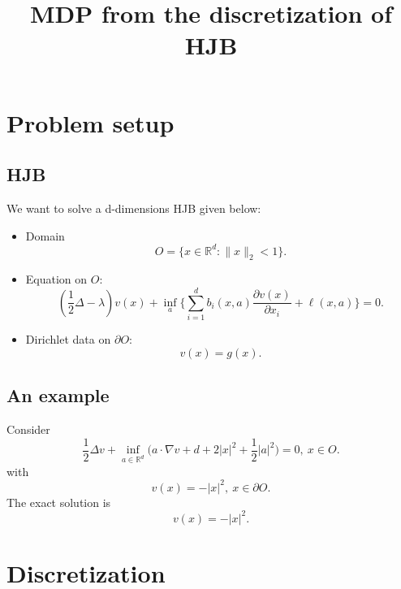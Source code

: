 \documentclass[11pt]{amsart}
\title{MDP from the discretization of HJB}
\begin{document}
\maketitle

\section{Problem setup}
\subsection{HJB}
We want to solve a d-dimensions HJB given below:
\begin{itemize}
 \item Domain 
 $$O = \{x\in \mathbb R^{d}: \|x\|_{2} < 1\}.$$
 \item Equation on $O$: 
 $$(\frac 1 2 \Delta -  \lambda) v(x) + \inf_a \Big\{
 \sum_{i=1}^db_i(x,a)  \frac{\partial v(x)}{\partial x_i}  
  + \ell(x,a)
 \Big\} = 0.$$
 \item Dirichlet data on $\partial O$:
 $$v(x) = g(x).$$
\end{itemize}

\subsection{An example} Consider
$$
 \frac 1 2 \Delta v + \inf_{a\in \mathbb R^{d}}
 \Big(a \cdot \nabla v +d + 2|x|^2 + \frac 1 2 |a| ^2 \Big) = 0, \ x\in O.
$$
with
$$
v(x) = -|x|^2, \ x\in \partial O.
$$
The exact solution is 
$$
v(x) =  -|x|^2.
$$

\section{Discretization}
\end{document}
